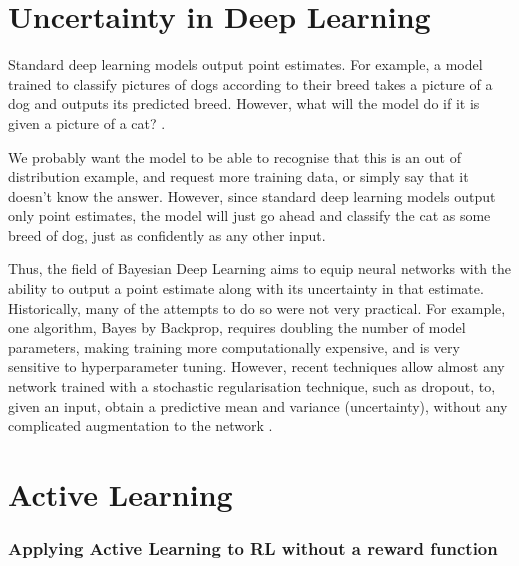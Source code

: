 \documentclass[11pt, a4paper, bibliography=totoc]{report}
\begin{document}
\chapter{Uncertainty in Deep Learning}
Standard deep learning models output point estimates. For example, a model trained to classify pictures of dogs according to their breed takes a picture of a dog and outputs its predicted breed. However, what will the model do if it is given a picture of a cat? \cite{Gal2017a}.

We probably want the model to be able to recognise that this is an out of distribution example, and request more training data, or simply say that it doesn't know the answer. However, since standard deep learning models output only point estimates, the model will just go ahead and classify the cat as some breed of dog, just as confidently as any other input.

Thus, the field of Bayesian Deep Learning aims to equip neural networks with the ability to output a point estimate along with its uncertainty in that estimate. Historically, many of the attempts to do so were not very practical. For example, one algorithm, Bayes by Backprop, requires doubling the number of model parameters, making training more computationally expensive, and is very sensitive to hyperparameter tuning. However, recent techniques allow almost any network trained with a stochastic regularisation technique, such as dropout, to, given an input, obtain a predictive mean and variance (uncertainty), without any complicated augmentation to the network \cite[p.~15]{Gal2017a}.

\chapter{Active Learning}
\subsection{Applying Active Learning to RL without a reward function}
\end{document}
